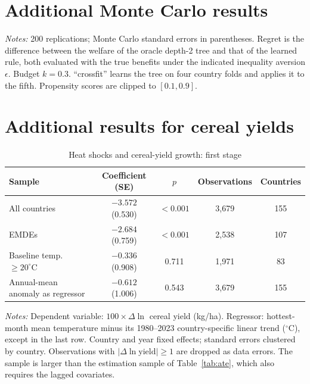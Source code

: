 \section{Additional Monte Carlo results}\label{app:mc}

\begin{table}[t]
\centering
\caption{Monte Carlo results}\label{tab:mc}
\scriptsize
\resizebox{\textwidth}{!}{}
\begin{minipage}{\textwidth}\footnotesize\smallskip
\emph{Notes:} 200 replications; Monte Carlo standard errors in parentheses. Regret is the
difference between the welfare of the oracle depth-2 tree and that of the learned rule, both
evaluated with the true benefits under the indicated inequality aversion $\epsilon$. Budget
$k=0.3$. ``crossfit'' learns the tree on four country folds and applies it to the fifth.
Propensity scores are clipped to $[0.1,0.9]$.
\end{minipage}
\end{table}



\section{Additional results for cereal yields}\label{app:agri}

\begin{table}[t]
\centering
\caption{Heat shocks and cereal-yield growth: first stage}\label{tab:firststage}
\small
\begin{tabular}{lcccc}
\toprule
Sample & Coefficient (SE) & $p$ & Observations & Countries \\
\midrule
All countries & $-3.572$ (0.530) & $<0.001$ & 3,679 & 155 \\
EMDEs & $-2.684$ (0.759) & $<0.001$ & 2,538 & 107 \\
Baseline temp.\ $\geq 20^{\circ}$C & $-0.336$ (0.908) & 0.711 & 1,971 & 83 \\
Annual-mean anomaly as regressor & $-0.612$ (1.006) & 0.543 & 3,679 & 155 \\
\bottomrule
\end{tabular}
\begin{minipage}{0.95\textwidth}\footnotesize\smallskip
\emph{Notes:} Dependent variable: $100\times\Delta\ln$ cereal yield (kg/ha). Regressor: hottest-month
mean temperature minus its 1980--2023 country-specific linear trend ($^{\circ}$C), except in the last
row. Country and year fixed effects; standard errors clustered by country. Observations with
$|\Delta\ln\text{yield}|\geq 1$ are dropped as data errors. The sample is larger than the estimation
sample of Table~\ref{tab:ate}, which also requires the lagged covariates.
\end{minipage}
\end{table}

